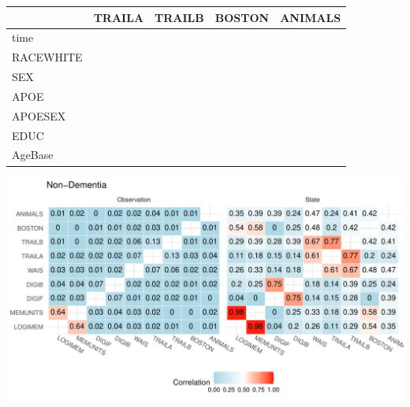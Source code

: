 \documentclass[
]{article}
\begin{document}
\begin{longtable}[t]{l|l|l|l|l}
\hline
  & TRAILA & TRAILB & BOSTON & ANIMALS\\
\hline
time & \cellcolor{red}{-0.06 (-0.10, -0.01)} & \cellcolor{red}{-0.14 (-0.18, -0.09)} & \cellcolor{white}{-0.00 (-0.04, 0.03)} & \cellcolor{red}{-0.08 (-0.13, -0.04)}\\
\hline
RACEWHITE & \cellcolor{green}{0.01 (-0.02, 0.05)} & \cellcolor{white}{0.08 (0.04, 0.12)} & \cellcolor{green}{0.06 (0.03, 0.09)} & \cellcolor{white}{0.04 (-0.00, 0.08)}\\
\hline
SEX & \cellcolor{white}{0.01 (-0.02, 0.05)} & \cellcolor{white}{-0.03 (-0.06, 0.00)} & \cellcolor{white}{0.01 (-0.02, 0.04)} & \cellcolor{white}{0.01 (-0.03, 0.04)}\\
\hline
APOE & \cellcolor{white}{-0.00 (-0.06, 0.06)} & \cellcolor{white}{-0.01 (-0.06, 0.04)} & \cellcolor{white}{-0.02 (-0.07, 0.02)} & \cellcolor{white}{-0.00 (-0.06, 0.05)}\\
\hline
APOESEX & \cellcolor{white}{-0.00 (-0.07, 0.07)} & \cellcolor{white}{0.01 (-0.05, 0.08)} & \cellcolor{white}{0.01 (-0.05, 0.06)} & \cellcolor{white}{-0.05 (-0.12, 0.02)}\\
\hline
EDUC & \cellcolor{green}{0.00 (-0.00, 0.00)} & \cellcolor{green}{0.00 (0.00, 0.01)} & \cellcolor{white}{0.00 (-0.00, 0.00)} & \cellcolor{white}{0.00 (-0.00, 0.00)}\\
\hline
AgeBase & \cellcolor{red}{-0.02 (-0.02, -0.01)} & \cellcolor{red}{-0.01 (-0.02, -0.01)} & \cellcolor{red}{-0.01 (-0.01, -0.01)} & \cellcolor{red}{-0.01 (-0.01, -0.01)}\\
\hline
\end{longtable}
\endgroup{}

\includegraphics{DataAnalysis_files/figure-latex/unnamed-chunk-5-1.pdf}
\end{document}
